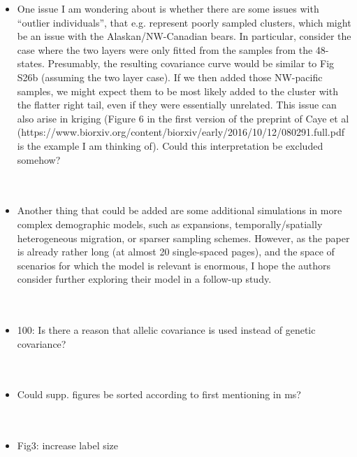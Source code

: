 \documentclass[11pt]{letter}
\newcommand{\gb}[1]{{\bf\color{black}{#1}}}
\begin{document}
\begin{itemize}
\item One issue I am wondering about is whether there are some issues with ``outlier individuals'', that e.g. represent poorly sampled clusters, which might be an issue with the Alaskan/NW-Canadian bears. In particular, consider the case where the two layers were only fitted from the samples from the 48-states. Presumably, the resulting covariance curve would be similar to Fig S26b (assuming the two layer case). If we then added those NW-pacific samples, we might expect them to be most likely added to the cluster with the flatter right tail, even if they were essentially unrelated. This issue can also arise in kriging (Figure 6 in the first version of the preprint of Caye et al (https://www.biorxiv.org/content/biorxiv/early/2016/10/12/080291.full.pdf is the example I am thinking of). Could this interpretation be excluded somehow?
\\\\
\gb{make sure it's in the disco}\\

\item Another thing that could be added are some additional simulations in more complex demographic models, such as expansions, temporally/spatially heterogeneous migration, or sparser sampling schemes. However, as the paper is already rather long (at almost 20 single-spaced pages), and the space of scenarios for which the model is relevant is enormous, I hope the authors consider further exploring their model in a follow-up study.\\\\
\gb{}\\

\item 100: Is there a reason that allelic covariance is used instead of genetic covariance?\\\\
\gb{
    Good question; we've added a paragraph on this to the Discussion.
}\\

\item Could supp. figures be sorted according to first mentioning in ms?\\\\
\gb{}\\

\item Fig3: increase label size\\\\
\gb{}\\


\end{itemize}
\end{document}
